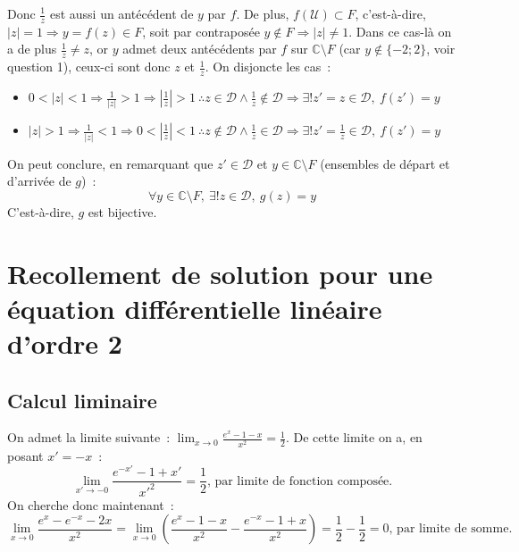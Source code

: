 \documentclass{article}
\newcommand{\abs}[1]{\left\vert #1 \right\vert}
\begin{document}
    Donc $\frac{1}{z}$ est aussi un antécédent de $y$ par $f$. De plus, $f(\mathscr{U})\subset F$, c'est-à-dire, $\abs{z}=1 \Rightarrow y=f(z)\in F$, soit par contraposée $y\not\in F \Rightarrow \abs{z}\neq 1$. Dans ce cas-là on a de plus $\frac{1}{z}\neq z$, or $y$ admet deux antécédents par $f$ sur $\mathbb{C}\setminus F$ (car $y\not\in\{-2;2\}$, voir question 1), ceux-ci sont donc $z$ et $\frac{1}{z}$. On disjoncte les cas~:
    \begin{itemize}
      \item $0<\abs{z}<1\Rightarrow \frac{1}{\abs{z}}>1 \Rightarrow \abs{\frac{1}{z}}>1\ \therefore z\in\mathscr{D} \wedge \frac{1}{z}\not\in\mathscr{D}\Rightarrow\exists! z'=z\in\mathscr{D},\ f(z')=y$
      \item $\abs{z}>1\Rightarrow \frac{1}{\abs{z}}<1 \Rightarrow 0<\abs{\frac{1}{z}}<1\ \therefore z\not\in\mathscr{D} \wedge \frac{1}{z}\in\mathscr{D}\Rightarrow\exists! z'=\frac{1}{z}\in\mathscr{D},\ f(z')=y$
    \end{itemize}
    On peut conclure, en remarquant que $z'\in\mathscr{D}$ et $y\in\mathbb{C}\setminus F$ (ensembles de départ et d'arrivée de $g$)~:
    \begin{displaymath}
      \forall y\in\mathbb{C}\setminus F,\ \exists! z\in\mathscr{D},\ g(z)=y
    \end{displaymath}
    C'est-à-dire, $g$ est bijective.

    \section{Recollement de solution pour une équation différentielle linéaire d'ordre 2}

    \subsection{Calcul liminaire}
    On admet la limite suivante~: $\lim_{x\to 0} \frac{e^x-1-x}{x^2}=\frac{1}{2}$. De cette limite on a, en posant $x'=-x$~:
    \begin{displaymath}
      \lim_{x'\to -0} \frac{e^{-x'}-1+x'}{{x'}^2}=\frac{1}{2} \text{, par limite de fonction composée.}
    \end{displaymath}
    On cherche donc maintenant~:
    \begin{equation}\label{EQ1}
      \lim_{x\to 0} \frac{e^x-e^{-x}-2x}{x^2} =\lim_{x\to 0}\left(\frac{e^x-1-x}{x^2}-\frac{e^{-x}-1+x}{x^2}\right)=\frac{1}{2}-\frac{1}{2}=0 \text{, par limite de somme.}
    \end{equation}
\end{document}
